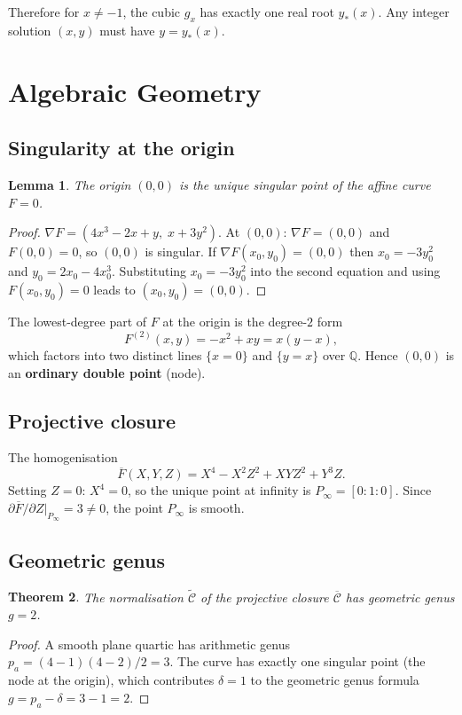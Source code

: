 \documentclass[12pt, a4paper]{article}
\newtheorem{theorem}{Theorem}[section]
\newtheorem{lemma}[theorem]{Lemma}
\theoremstyle{definition}
\newcommand{\Q}{\mathbb{Q}}
\begin{document}
\noindent
Therefore for $x \neq -1$, the cubic $g_x$ has exactly one real root $y_*(x)$.  Any integer
solution $(x,y)$ must have $y = y_*(x)$.

\section{Algebraic Geometry}
\label{sec:ag}

\subsection{Singularity at the origin}

\begin{lemma}\label{lem:sing}
  The origin $(0,0)$ is the unique singular point of the affine curve $F = 0$.
\end{lemma}
\begin{proof}
  $\nabla F = (4x^3 - 2x + y,\; x + 3y^2)$.
  At $(0,0)$: $\nabla F = (0,0)$ and $F(0,0) = 0$, so $(0,0)$ is singular.
  If $\nabla F (x_0,y_0) = (0,0)$ then $x_0 = -3y_0^2$ and $y_0 = 2x_0 - 4x_0^3$.
  Substituting $x_0 = -3y_0^2$ into the second equation and using $F(x_0,y_0) = 0$
  leads to $(x_0,y_0) = (0,0)$.
\end{proof}

The lowest-degree part of $F$ at the origin is the degree-$2$ form
\[
  F^{(2)}(x,y) = -x^2 + xy = x(y-x),
\]
which factors into two distinct lines $\{x=0\}$ and $\{y=x\}$ over $\Q$.
Hence $(0,0)$ is an \textbf{ordinary double point} (node).

\subsection{Projective closure}

The homogenisation
\[
  \overline{F}(X,Y,Z) = X^4 - X^2Z^2 + XYZ^2 + Y^3Z.
\]
Setting $Z = 0$: $X^4 = 0$, so the unique point at infinity is $P_\infty = [0:1:0]$.
Since $\partial\overline{F}/\partial Z\big|_{P_\infty} = 3 \neq 0$, the point $P_\infty$ is smooth.

\subsection{Geometric genus}

\begin{theorem}\label{thm:genus}
  The normalisation $\widetilde{\mathcal{C}}$ of the projective closure $\overline{\mathcal{C}}$
  has geometric genus $g = 2$.
\end{theorem}
\begin{proof}
  A smooth plane quartic has arithmetic genus $p_a = (4-1)(4-2)/2 = 3$.  The curve has
  exactly one singular point (the node at the origin), which contributes $\delta = 1$ to
  the geometric genus formula $g = p_a - \delta = 3 - 1 = 2$.
\end{proof}
\end{document}
